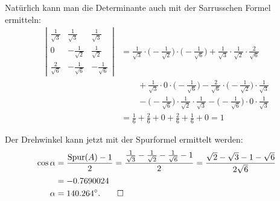 \begin{loesung}
\begin{teilaufgaben}
Natürlich kann man die Determinante auch mit der Sarrusschen Formel ermitteln:
\begin{align*}
\left|
\begin{matrix}
\frac1{\sqrt{3}}&\frac1{\sqrt{3}}&\frac1{\sqrt{3}}\\
0&-\frac1{\sqrt{2}}&\frac1{\sqrt{2}}\\
\frac2{\sqrt{6}}&-\frac1{\sqrt{6}}&-\frac1{\sqrt{6}}
\end{matrix}
\right|
&=
\frac1{\sqrt{3}}\cdot\biggl(-\frac1{\sqrt{2}}\biggr)\cdot\biggl(-\frac1{\sqrt{6}}\biggr)
+
\frac1{\sqrt{3}}\cdot\frac1{\sqrt{2}}\cdot\frac2{\sqrt{6}}
\\
&\qquad 
+
\frac1{\sqrt{3}}\cdot0\cdot\biggl(-\frac1{\sqrt{6}}\biggr)
-
\frac2{\sqrt{6}}\cdot\biggl(-\frac1{\sqrt{2}}\biggr)\cdot\frac1{\sqrt{3}}
\\
&\qquad
-
\biggl(-\frac1{\sqrt{6}}\biggr)\cdot\frac1{\sqrt{2}}\cdot \frac1{\sqrt{3}}
-
\biggl(-\frac1{\sqrt{6}}\biggr)\cdot0\cdot\frac1{\sqrt{3}}
\\
&=
\frac16+\frac26+0+\frac26+\frac16+0=1
\end{align*}
\item
Der Drehwinkel kann jetzt mit der Spurformel ermittelt werden:
\begin{align*}
\cos \alpha
&=\frac{\operatorname{Spur}(A)-1}2
=\frac{\frac1{\sqrt{3}}-\frac1{\sqrt{2}}-\frac1{\sqrt{6}}-1}2
=\frac{\sqrt{2}-\sqrt{3}-1-\sqrt{6}}{2\sqrt{6}}
\\
&=-0.7690024
\\
\alpha&=140.264^\circ.
\qedhere
\end{align*}
\end{teilaufgaben}
\end{loesung}

